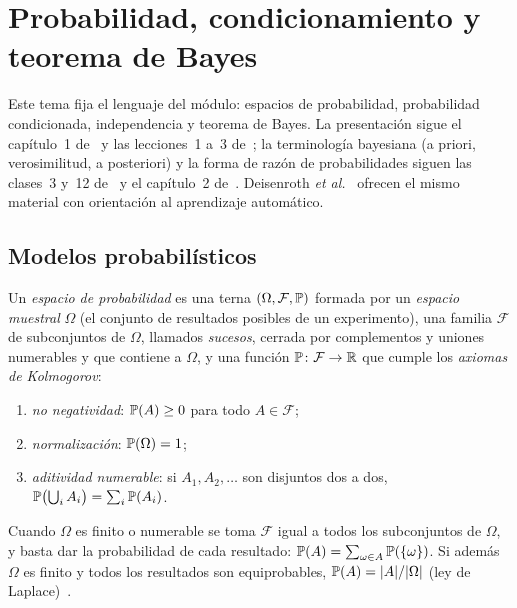 \chapter{Probabilidad, condicionamiento y teorema de Bayes}
\label{tema:1}

Este tema fija el lenguaje del módulo: espacios de probabilidad, probabilidad condicionada, independencia y teorema de Bayes. La presentación sigue el capítulo~1 de~\cite{bt} y las lecciones~1 a~3 de~\cite{mit6041}; la terminología bayesiana (a priori, verosimilitud, a posteriori) y la forma de razón de probabilidades siguen las clases~3 y~12 de~\cite{mit1805} y el capítulo~2 de~\cite{bh}. Deisenroth \emph{et al.}~\cite[§6.1 y §6.3]{mml} ofrecen el mismo material con orientación al aprendizaje automático.

\section{Modelos probabilísticos}

\begin{definicion}\label{def:espacio}
Un \emph{espacio de probabilidad} es una terna $(\Omega,\mathcal{F},\mathbb{P})$ formada por un \emph{espacio muestral} $\Omega$ (el conjunto de resultados posibles de un experimento), una familia $\mathcal{F}$ de subconjuntos de $\Omega$, llamados \emph{sucesos}, cerrada por complementos y uniones numerables y que contiene a $\Omega$, y una función $\mathbb{P}\colon\mathcal{F}\to\mathbb{R}$ que cumple los \emph{axiomas de Kolmogorov}:
\begin{enumerate}
  \item \emph{no negatividad}: $\mathbb{P}(A)\ge 0$ para todo $A\in\mathcal{F}$;
  \item \emph{normalización}: $\mathbb{P}(\Omega)=1$;
  \item \emph{aditividad numerable}: si $A_1,A_2,\dots$ son disjuntos dos a dos, $\mathbb{P}\bigl(\bigcup_{i}A_i\bigr)=\sum_{i}\mathbb{P}(A_i)$.
\end{enumerate}
\end{definicion}

Cuando $\Omega$ es finito o numerable se toma $\mathcal{F}$ igual a todos los subconjuntos de $\Omega$, y basta dar la probabilidad de cada resultado: $\mathbb{P}(A)=\sum_{\omega\in A}\mathbb{P}(\{\omega\})$. Si además $\Omega$ es finito y todos los resultados son equiprobables, $\mathbb{P}(A)=\lvert A\rvert/\lvert\Omega\rvert$ (ley de Laplace)~\cite[§1.2]{bt}.

